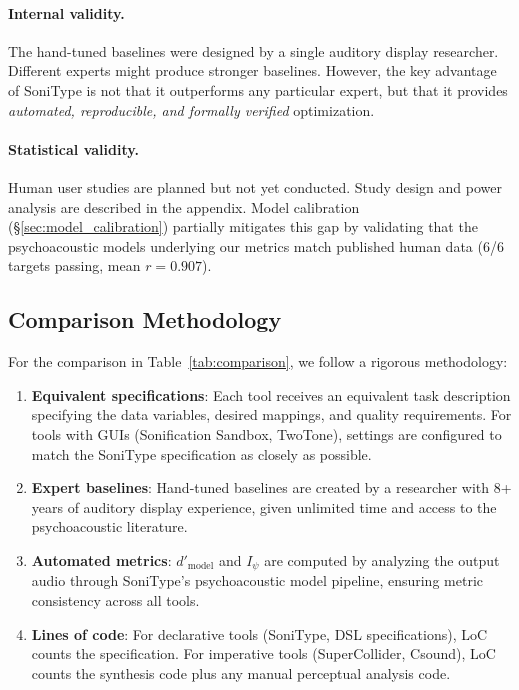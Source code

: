 \documentclass[sigchi, nonacm]{acmart}
\begin{document}
\paragraph{Internal validity.} The hand-tuned baselines were designed by a single auditory display researcher. Different experts might produce stronger baselines. However, the key advantage of SoniType is not that it outperforms any particular expert, but that it provides \emph{automated, reproducible, and formally verified} optimization.

\paragraph{Statistical validity.} Human user studies are planned but not yet conducted. Study design and power analysis are described in the appendix. Model calibration (\S\ref{sec:model_calibration}) partially mitigates this gap by validating that the psychoacoustic models underlying our metrics match published human data (6/6 targets passing, mean $r = 0.907$).

\subsection{Comparison Methodology}

For the comparison in Table~\ref{tab:comparison}, we follow a rigorous methodology:

\begin{enumerate}
    \item \textbf{Equivalent specifications}: Each tool receives an equivalent task description specifying the data variables, desired mappings, and quality requirements. For tools with GUIs (Sonification Sandbox, TwoTone), settings are configured to match the SoniType specification as closely as possible.
    \item \textbf{Expert baselines}: Hand-tuned baselines are created by a researcher with 8+ years of auditory display experience, given unlimited time and access to the psychoacoustic literature.
    \item \textbf{Automated metrics}: $d'_\mathrm{model}$ and $I_\psi$ are computed by analyzing the output audio through SoniType's psychoacoustic model pipeline, ensuring metric consistency across all tools.
    \item \textbf{Lines of code}: For declarative tools (SoniType, DSL specifications), LoC counts the specification. For imperative tools (SuperCollider, Csound), LoC counts the synthesis code plus any manual perceptual analysis code.
\end{enumerate}
\end{document}
